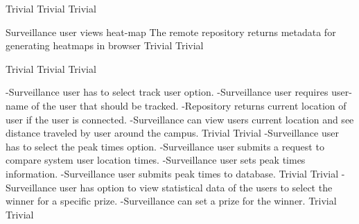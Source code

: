  		{Trivial}
    {Trivial}
    {Trivial}

\FuncReq
    {Surveillance user views heat-map}
		{The remote repository returns metadata for generating heatmaps in browser}
    {Trivial}
    {Trivial}

		{Trivial}
    {Trivial}
    {Trivial}
	
		{-Surveillance user has to select track user option.
		-Surveillance user requires user-name of the user that should be tracked.
		-Repository returns current location of user if the user is connected.
		-Surveillance can view users current location and see distance traveled by user around the campus.}
    {Trivial}
    {Trivial}
		{-Surveillance user has to select the peak times option.
		-Surveillance user submits a request to compare system user location times.
		-Surveillance user sets peak times information.
		-Surveillance user submits peak times to database.}
    {Trivial}
    {Trivial}
		{-Surveillance user has option to view statistical data of the users to select the winner for a specific prize.
		 -Surveillance can set a prize for the winner.}
    {Trivial}
    {Trivial}
